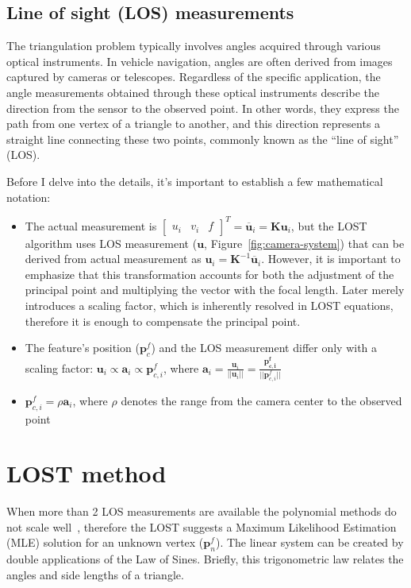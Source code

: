 \subsection{Line of sight (LOS) measurements}

The triangulation problem typically involves angles acquired through various optical instruments. In vehicle navigation, angles are often derived from images captured by cameras or telescopes. Regardless of the specific application, the angle measurements obtained through these optical instruments describe the direction from the sensor to the observed point. In other words, they express the path from one vertex of a triangle to another, and this direction represents a straight line connecting these two points, commonly known as the ``line of sight'' (LOS).

Before I delve into the details, it's important to establish a few mathematical notation:
\begin{itemize}
    \item The actual measurement is $\begin{bmatrix} u_i & v_i & f\end{bmatrix}^T = \overline{\mathbf{u}}_i = \mathbf{K}\mathbf{u}_i$, but the LOST algorithm uses LOS measurement ($\mathbf{u}$, Figure~\ref{fig:camera-system}) that can be derived from actual measurement as $\mathbf{u}_i=\mathbf{K}^{-1}\overline{\mathbf{u}}_i$. However, it is important to emphasize that this transformation accounts for both the adjustment of the principal point and multiplying the vector with the focal length. Later merely introduces a scaling factor, which is inherently resolved in LOST equations, therefore it is enough to compensate the principal point.
    \item The feature's position ($\mathbf{p}_c^f$) and the LOS measurement differ only with a scaling factor: $\mathbf{u}_i \propto \mathbf{a}_i \propto \mathbf{p}_{c,i}^f$, where $\mathbf{a}_i=\frac{\mathbf{u}_i}{||\mathbf{u}_i||} = \frac{\mathbf{p_{c,i}^f}}{||\mathbf{p}_{c,i}^f||}$ 
    \item $\mathbf{p}_{c,i}^f=\rho\mathbf{a}_i$, where $\rho$ denotes the range from the camera center to the observed point
\end{itemize}

\section{LOST method}

When more than 2 LOS measurements are available the polynomial methods do not scale well~\cite{absolute-triangulation}, therefore the LOST suggests a Maximum Likelihood Estimation (MLE) solution for an unknown vertex ($\mathbf{p}_n^f$). The linear system can be created by double applications of the Law of Sines. Briefly, this trigonometric law relates the angles and side lengths of a triangle. 

